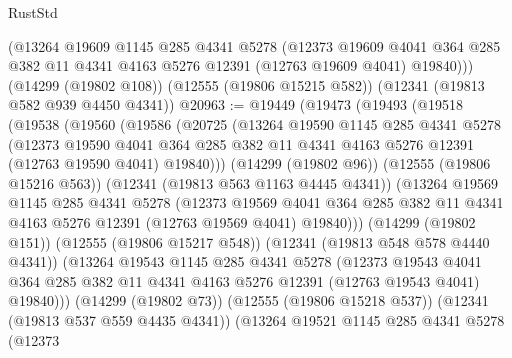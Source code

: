 \begin{lexlean}{RustStd}
\begin{coremodule}
      (@13264
        @19609
        @1145
        @285
        @4341
        @5278
        (@12373
          @19609
          @4041
          @364
          @285
          @382
          @11
          @4341
          @4163
          @5276
          @12391
          (@12763 @19609 @4041)
          @19840)))
    (@14299 (@19802 @108))
    (@12555 (@19806 @15215 @582))
    (@12341 (@19813 @582 @939 @4450 @4341))
@20963 := @19449
    (@19473
      (@19493
        (@19518
          (@19538
            (@19560
              (@19586
                (@20725
                  (@13264
                    @19590
                    @1145
                    @285
                    @4341
                    @5278
                    (@12373
                      @19590
                      @4041
                      @364
                      @285
                      @382
                      @11
                      @4341
                      @4163
                      @5276
                      @12391
                      (@12763 @19590 @4041)
                      @19840)))
                (@14299 (@19802 @96))
                (@12555 (@19806 @15216 @563))
                (@12341 (@19813 @563 @1163 @4445 @4341))
                (@13264
                  @19569
                  @1145
                  @285
                  @4341
                  @5278
                  (@12373
                    @19569
                    @4041
                    @364
                    @285
                    @382
                    @11
                    @4341
                    @4163
                    @5276
                    @12391
                    (@12763 @19569 @4041)
                    @19840)))
              (@14299 (@19802 @151))
              (@12555 (@19806 @15217 @548))
              (@12341 (@19813 @548 @578 @4440 @4341))
              (@13264
                @19543
                @1145
                @285
                @4341
                @5278
                (@12373
                  @19543
                  @4041
                  @364
                  @285
                  @382
                  @11
                  @4341
                  @4163
                  @5276
                  @12391
                  (@12763 @19543 @4041)
                  @19840)))
            (@14299 (@19802 @73))
            (@12555 (@19806 @15218 @537))
            (@12341 (@19813 @537 @559 @4435 @4341))
            (@13264
              @19521
              @1145
              @285
              @4341
              @5278
              (@12373

\end{coremodule}
\end{lexlean}
